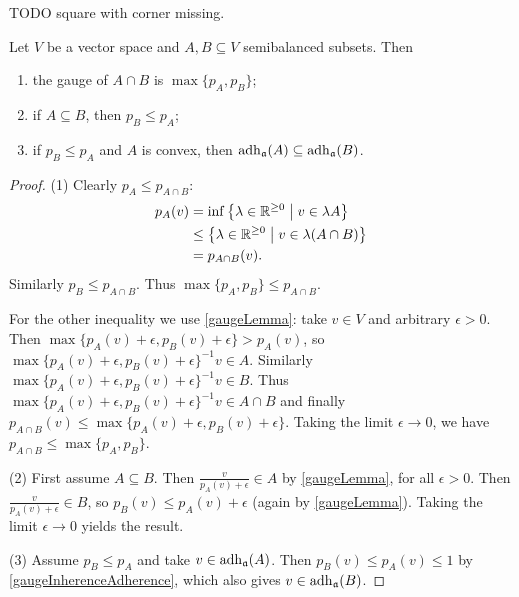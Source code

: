 \begin{example}
TODO square with corner missing.
\end{example}



\begin{proposition} \label{gaugeConstructions}
Let $V$ be a vector space and $A,B\subseteq V$ semibalanced subsets. Then
\begin{enumerate}
\item the gauge of $A\cap B$ is $\max\{p_A, p_B\}$;
\item if $A\subseteq B$, then $p_B \leq p_A$;
\item if $p_B \leq p_A$ and $A$ is convex, then $\operatorname{adh}_\mathfrak{a}(A) \subseteq \operatorname{adh}_\mathfrak{a}(B)$.
\end{enumerate}
\end{proposition}
\begin{proof}
(1) Clearly $p_A \leq p_{A\cap B}$:
\begin{align*}
p_A(v) &= \inf\setbuilder{\lambda\in\R^{\geq 0}}{v\in \lambda A} \\
&\leq \setbuilder{\lambda\in\R^{\geq 0}}{v\in \lambda (A\cap B)} \\
&= p_{A\cap B}(v).
\end{align*}
Similarly $p_B \leq p_{A\cap B}$. Thus $\max\{p_A, p_B\} \leq p_{A\cap B}$.

For the other inequality we use \ref{gaugeLemma}: take $v\in V$ and arbitrary $\epsilon > 0$. Then $\max\{p_A(v)+\epsilon, p_B(v)+\epsilon\} > p_A(v)$, so $\max\{p_A(v)+\epsilon, p_B(v)+\epsilon\}^{-1}v\in A$. Similarly $\max\{p_A(v)+\epsilon, p_B(v)+\epsilon\}^{-1}v\in B$. Thus $\max\{p_A(v)+\epsilon, p_B(v)+\epsilon\}^{-1}v \in A\cap B$ and finally $p_{A\cap B}(v) \leq \max\{p_A(v)+\epsilon, p_B(v)+\epsilon\}$. Taking the limit $\epsilon \to 0$, we have $p_{A\cap B} \leq \max\{p_A, p_B\}$.

(2) First assume $A\subseteq B$. Then $\frac{v}{p_A(v)+\epsilon}\in A$ by \ref{gaugeLemma}, for all $\epsilon >0$. Then $\frac{v}{p_A(v)+\epsilon}\in B$, so $p_B(v) \leq p_A(v)+\epsilon$ (again by \ref{gaugeLemma}). Taking the limit $\epsilon\to 0$ yields the result.

(3) Assume $p_B \leq p_A$ and take $v\in \operatorname{adh}_\mathfrak{a}(A)$. Then $p_B(v) \leq p_A(v) \leq 1$ by \ref{gaugeInherenceAdherence}, which also gives $v\in\operatorname{adh}_\mathfrak{a}(B)$.
\end{proof}



